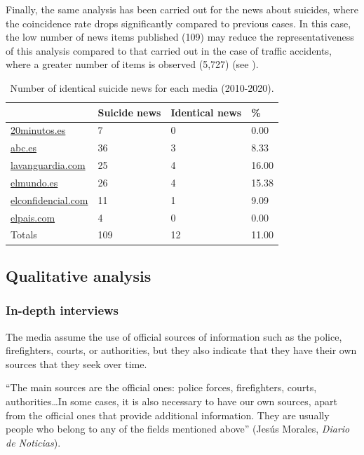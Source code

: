 Finally, the same analysis has been carried out for the news about
suicides, where the coincidence rate drops significantly compared to
previous cases. In this case, the low number of news items published
(109) may reduce the representativeness of this analysis compared to
that carried out in the case of traffic accidents, where a greater
number of items is observed (5,727) (see ).

\begin{table}[!htpb]
\centering
\begin{threeparttable}
\caption{Number of identical suicide news for each media (2010-2020).}
\label{tab-05}
\begin{tabular}{*{4}{l}}
\toprule
	& Suicide news & Identical news & \%\\
\midrule
\url{20minutos.es} & 7 & 0 & 0.00 \\
\url{abc.es} & 36 & 3 & 8.33 \\
\url{lavanguardia.com} & 25 & 4 & 16.00 \\
\url{elmundo.es} & 26 & 4 & 15.38 \\
\url{elconfidencial.com} & 11 & 1 & 9.09 \\
\url{elpais.com} & 4 & 0 & 0.00 \\
Totals & 109 & 12 & 11.00 \\
\bottomrule
\end{tabular}
\end{threeparttable}
\end{table}

\subsection{Qualitative analysis}\label{sub-sec-qualitativeanalysis}
\subsubsection{In-depth interviews}\label{sub-sub-sec-in-depthinterviews}

The media assume the use of official sources of information such as the
police, firefighters, courts, or authorities, but they also indicate
that they have their own sources that they seek over time.

\enquote{The main sources are the official ones: police forces, firefighters,
courts, authorities\ldots In some cases, it is also necessary to have
our own sources, apart from the official ones that provide additional
information. They are usually people who belong to any of the fields
mentioned above} (Jesús Morales, \emph{Diario de Noticias}).

